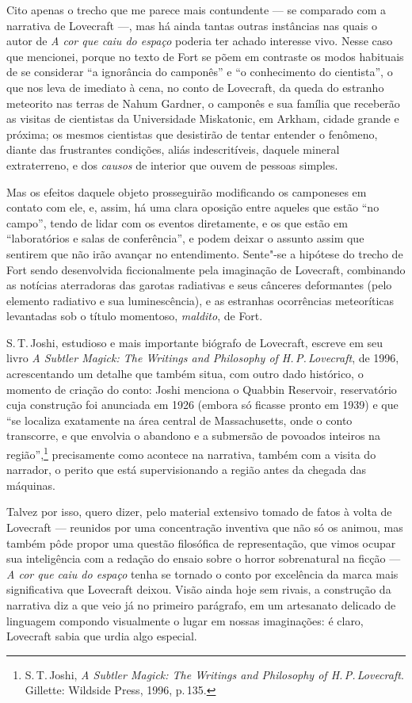 Cito apenas o trecho que me parece mais contundente --- se comparado com
a narrativa de Lovecraft ---, mas há ainda tantas outras instâncias nas
quais o autor de \textit{A cor que caiu do espaço} poderia ter achado
interesse vivo. Nesse caso que mencionei, porque no texto de Fort se
põem em contraste os modos habituais de se considerar ``a ignorância
do camponês'' e ``o conhecimento do cientista'', o que nos leva de
imediato à cena, no conto de Lovecraft, da queda do estranho meteorito
nas terras de Nahum Gardner, o camponês e sua família que receberão as
visitas de cientistas da Universidade Miskatonic, em Arkham, cidade
grande e próxima; os mesmos cientistas que desistirão de tentar entender
o fenômeno, diante das frustrantes condições, aliás indescritíveis,
daquele mineral extraterreno, e dos \textit{causos} de interior que ouvem de
pessoas simples.

Mas os efeitos daquele objeto prosseguirão modificando os camponeses em
contato com ele, e, assim, há uma clara oposição entre aqueles que estão
``no campo'', tendo de lidar com os eventos diretamente, e os que estão
em ``laboratórios e salas de conferência'', e podem deixar o assunto
assim que sentirem que não irão avançar no entendimento. Sente"-se a
hipótese do trecho de Fort sendo desenvolvida ficcionalmente pela
imaginação de Lovecraft, combinando as notícias aterradoras das garotas
radiativas e seus cânceres deformantes (pelo elemento radiativo e sua
luminescência), e as estranhas ocorrências meteoríticas levantadas sob o
título momentoso, \textit{maldito}, de Fort.

S.\,T.\,Joshi, estudioso e mais importante biógrafo de Lovecraft, escreve
em seu livro \textit{A Subtler Magick: The Writings and Philosophy of H.\,P.\,Lovecraft}, de 1996, acrescentando um detalhe que também situa, com outro dado histórico, o
momento de criação do conto: Joshi menciona o Quabbin Reservoir,
reservatório cuja construção foi anunciada em 1926 (embora só ficasse
pronto em 1939) e que ``se localiza exatamente na área central de
Massachusetts, onde o conto transcorre, e que envolvia o abandono e a
submersão de povoados inteiros na região'',\footnote{S.\,T.\,Joshi, \textit{A
  Subtler Magick: The Writings and Philosophy of H.\,P.\,Lovecraft}.
  Gillette: Wildside Press, 1996, p.\,135.} precisamente como acontece na
narrativa, também com a visita do narrador, o perito que está
supervisionando a região antes da chegada das máquinas.

Talvez por isso, quero dizer, pelo material extensivo tomado de fatos à
volta de Lovecraft --- reunidos por uma concentração inventiva que não
só os animou, mas também pôde propor uma questão filosófica de
representação, que vimos ocupar sua inteligência com a redação do ensaio
sobre o horror sobrenatural na ficção --- \textit{A cor que caiu do espaço}
tenha se tornado o conto por excelência da marca mais significativa que
Lovecraft deixou. Visão ainda hoje sem rivais, a construção da narrativa
diz a que veio já no primeiro parágrafo, em um artesanato delicado de
linguagem compondo visualmente o lugar em nossas imaginações: é claro,
Lovecraft sabia que urdia algo especial.

